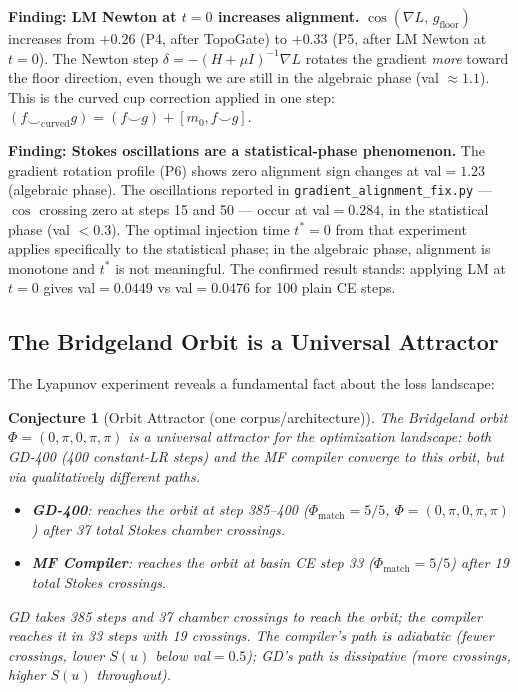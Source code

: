 \documentclass[11pt]{amsart}
\newtheorem{conjecture}[theorem]{Conjecture}
\begin{document}
\textbf{Finding: LM Newton at $t=0$ increases alignment.}
$\cos(\nabla L,\, g_\mathrm{floor})$ increases from $+0.26$ (P4, after TopoGate)
to $+0.33$ (P5, after LM Newton at $t=0$).
The Newton step $\delta = -(H+\mu I)^{-1}\nabla L$
rotates the gradient \emph{more} toward the floor direction,
even though we are still in the algebraic phase (val $\approx 1.1$).
This is the curved cup correction applied in one step:
$(f \smile_\mathrm{curved} g) = (f \smile g) + [m_0, f \smile g]$.

\textbf{Finding: Stokes oscillations are a statistical-phase phenomenon.}
The gradient rotation profile (P6) shows zero alignment sign changes
at val$= 1.23$ (algebraic phase).
The oscillations reported in \texttt{gradient\_alignment\_fix.py}
--- $\cos$ crossing zero at steps 15 and 50 --- occur at val$=0.284$,
in the statistical phase (val $< 0.3$).
The optimal injection time $t^*=0$ from that experiment
applies specifically to the statistical phase; in the algebraic phase,
alignment is monotone and $t^*$ is not meaningful.
The confirmed result stands: applying LM at $t=0$ gives
val$=0.0449$ vs val$=0.0476$ for 100 plain CE steps.

\subsection{The Bridgeland Orbit is a Universal Attractor}
\label{sec:orbit-attractor}

The Lyapunov experiment reveals
a fundamental fact about the loss landscape:

\begin{conjecture}[Orbit Attractor (one corpus/architecture)]
\label{thm:orbit}
The Bridgeland orbit $\Phi = (0,\pi,0,\pi,\pi)$
is a universal attractor for the optimization landscape:
both GD-400 (400 constant-LR steps) and the MF compiler
converge to this orbit, but via qualitatively different paths.

\begin{itemize}
\item \textbf{GD-400}: reaches the orbit at step 385--400
  ($\Phi_\mathrm{match}=5/5$, $\Phi=(0,\pi,0,\pi,\pi)$)
  after 37 total Stokes chamber crossings.
\item \textbf{MF Compiler}: reaches the orbit at basin CE step 33
  ($\Phi_\mathrm{match}=5/5$) after 19 total Stokes crossings.
\end{itemize}
GD takes 385 steps and 37 chamber crossings to reach the orbit;
the compiler reaches it in 33 steps with 19 crossings.
The compiler's path is adiabatic (fewer crossings, lower $S(u)$ below val$=0.5$);
GD's path is dissipative (more crossings, higher $S(u)$ throughout).
\end{conjecture}
\end{document}
